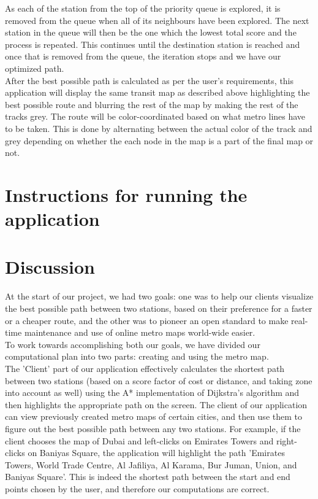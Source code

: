 \documentclass[fontsize=11pt]{article}
\begin{document}
    As each of the station from the top of the priority queue is explored, it is removed from the queue when all of its neighbours have been explored. The next station in the queue will then be the one which the lowest total score and the process is repeated. This continues until the destination station is reached and once that is removed from the queue, the iteration stops and we have our optimized path.
    \\
    After the best possible path is calculated as per the user's requirements, this application will display the same transit map as described above highlighting the best possible route and blurring the rest of the map by making the rest of the tracks grey. The route will be color-coordinated based on what metro lines have to be taken. This is done by alternating between the actual color of the track and grey depending on whether the each node in the map is a part of the final map or not.
    \section*{Instructions for running the application}
    \section*{Discussion}
    At the start of our project, we had two goals: one was to help our clients visualize the best possible path between two stations, based on their preference for a faster or a cheaper route, and the other was to pioneer an open standard to make real-time maintenance and use of online metro maps world-wide easier. \\

To work towards accomplishing both our goals, we have divided our computational plan into two parts: creating and using the metro map. \\

The 'Client' part of our application effectively calculates the shortest path between two stations (based on a score factor of cost or distance, and taking zone into account as well) using the A* implementation of Dijkstra's algorithm and then highlights the appropriate path on the screen. The client of our application can view previously created metro maps of certain cities, and then use them to figure out the best possible path between any two stations. For example, if the client chooses the map of Dubai and left-clicks on Emirates Towers and right-clicks on Baniyas Square, the application will highlight the path 'Emirates Towers, World Trade Centre, Al Jafiliya, Al Karama, Bur Juman, Union, and Baniyas Square'. This is indeed the shortest path between the start and end points chosen by the user, and therefore our computations are correct. \\
\end{document}
